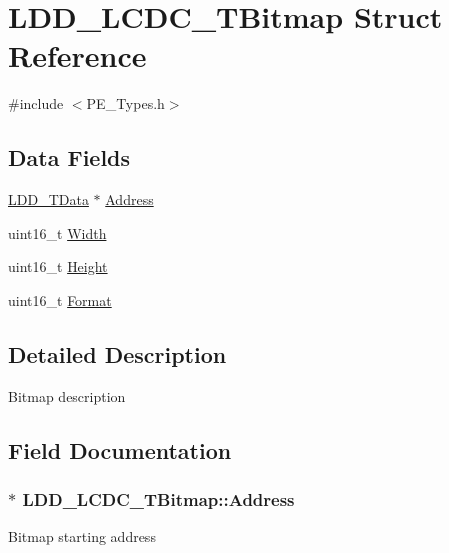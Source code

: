 \hypertarget{struct_l_d_d___l_c_d_c___t_bitmap}{}\section{L\+D\+D\+\_\+\+L\+C\+D\+C\+\_\+\+T\+Bitmap Struct Reference}
\label{struct_l_d_d___l_c_d_c___t_bitmap}


{\ttfamily \#include $<$P\+E\+\_\+\+Types.\+h$>$}

\subsection*{Data Fields}
\begin{DoxyCompactItemize}
\item 
\hyperlink{group___p_e___types__module_gade8ef9401405bd941b6da738b807f980}{L\+D\+D\+\_\+\+T\+Data} $\ast$ \hyperlink{struct_l_d_d___l_c_d_c___t_bitmap_a5501acee73fa929201a06eccc4821a7a}{Address}
\item 
uint16\+\_\+t \hyperlink{struct_l_d_d___l_c_d_c___t_bitmap_af88017bd29e49292265c1fda6dc5463d}{Width}
\item 
uint16\+\_\+t \hyperlink{struct_l_d_d___l_c_d_c___t_bitmap_a13fea31674709c4f681e6c86d3b71206}{Height}
\item 
uint16\+\_\+t \hyperlink{struct_l_d_d___l_c_d_c___t_bitmap_a8f886a6ce6e67d4b070c20bdd5ce495a}{Format}
\end{DoxyCompactItemize}


\subsection{Detailed Description}
Bitmap description 

\subsection{Field Documentation}
\hypertarget{struct_l_d_d___l_c_d_c___t_bitmap_a5501acee73fa929201a06eccc4821a7a}{}
\subsubsection[{Address}]{$\ast$ L\+D\+D\+\_\+\+L\+C\+D\+C\+\_\+\+T\+Bitmap\+::\+Address}\label{struct_l_d_d___l_c_d_c___t_bitmap_a5501acee73fa929201a06eccc4821a7a}
Bitmap starting address \hypertarget{struct_l_d_d___l_c_d_c___t_bitmap_a8f886a6ce6e67d4b070c20bdd5ce495a}{}
